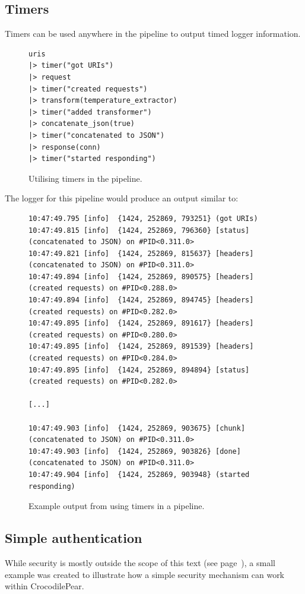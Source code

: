 \documentclass{cslthse-msc}
\begin{document}
\subsection{Timers}
Timers can be used anywhere in the pipeline to output timed logger information.

\begin{figure}[H]
  \centering
\begin{lstlisting}[breaklines=true,frame=single]
uris
|> timer("got URIs")
|> request
|> timer("created requests")
|> transform(temperature_extractor)
|> timer("added transformer")
|> concatenate_json(true)
|> timer("concatenated to JSON")
|> response(conn)
|> timer("started responding")
\end{lstlisting}
  \caption{Utilising timers in the pipeline.}
\end{figure}

The logger for this pipeline would produce an output similar to:

\begin{figure}[H]
  \centering
\begin{lstlisting}[breaklines=true,frame=single]
10:47:49.795 [info]  {1424, 252869, 793251} (got URIs)
10:47:49.815 [info]  {1424, 252869, 796360} [status] (concatenated to JSON) on #PID<0.311.0>
10:47:49.821 [info]  {1424, 252869, 815637} [headers] (concatenated to JSON) on #PID<0.311.0>
10:47:49.894 [info]  {1424, 252869, 890575} [headers] (created requests) on #PID<0.288.0>
10:47:49.894 [info]  {1424, 252869, 894745} [headers] (created requests) on #PID<0.282.0>
10:47:49.895 [info]  {1424, 252869, 891617} [headers] (created requests) on #PID<0.280.0>
10:47:49.895 [info]  {1424, 252869, 891539} [headers] (created requests) on #PID<0.284.0>
10:47:49.895 [info]  {1424, 252869, 894894} [status] (created requests) on #PID<0.282.0>

[...]

10:47:49.903 [info]  {1424, 252869, 903675} [chunk] (concatenated to JSON) on #PID<0.311.0>
10:47:49.903 [info]  {1424, 252869, 903826} [done] (concatenated to JSON) on #PID<0.311.0>
10:47:49.904 [info]  {1424, 252869, 903948} (started responding)
\end{lstlisting}
  \caption{Example output from using timers in a pipeline.}
\end{figure}

\subsection{Simple authentication}
While security is mostly outside the scope of this text (see page~\pageref{sec:security}), a small example was created to illustrate how a simple security mechanism can work within CrocodilePear.
\end{document}
